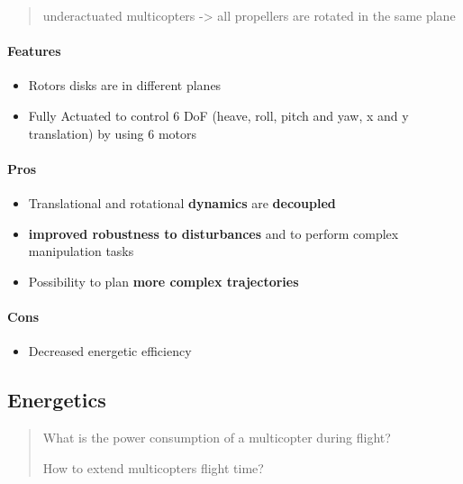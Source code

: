 \documentclass[]{article}
\let\oldparagraph\paragraph
\renewcommand{\paragraph}[1]{\oldparagraph{#1}\mbox{}}
\begin{document}
\begin{quote}
underactuated multicopters -\textgreater{} all propellers are rotated in
the same plane
\end{quote}

\paragraph{Features}\label{header-n343}

\begin{itemize}
\item
  Rotors disks are in different planes
\item
  Fully Actuated to control 6 DoF (heave, roll, pitch and yaw, x and y
  translation) by using 6 motors
\end{itemize}

\paragraph{Pros}\label{header-n349}

\begin{itemize}
\item
  Translational and rotational \textbf{dynamics} are \textbf{decoupled}
\item
  \textbf{improved robustness to disturbances} and to perform complex
  manipulation tasks
\item
  Possibility to plan \textbf{more complex trajectories}
\end{itemize}

\paragraph{Cons}\label{header-n357}

\begin{itemize}
\item
  Decreased energetic efficiency
\end{itemize}

\subsection{Energetics}\label{header-n361}

\begin{quote}
What is the power consumption of a multicopter during flight?

How to extend multicopters flight time?
\end{quote}
\end{document}
